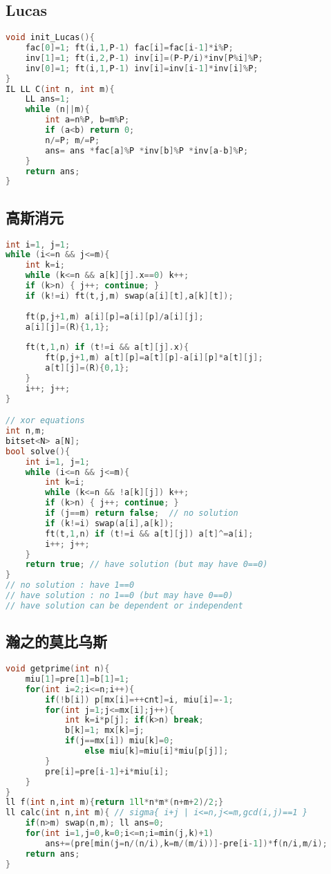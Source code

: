 \documentclass[landscape,a4paper]{article}
\begin{document}
\subsection{Lucas}
\begin{lstlisting}[language=C++]
void init_Lucas(){
	fac[0]=1; ft(i,1,P-1) fac[i]=fac[i-1]*i%P;
	inv[1]=1; ft(i,2,P-1) inv[i]=(P-P/i)*inv[P%i]%P;
	inv[0]=1; ft(i,1,P-1) inv[i]=inv[i-1]*inv[i]%P;
}
IL LL C(int n, int m){
	LL ans=1;
	while (n||m){
		int a=n%P, b=m%P;
		if (a<b) return 0;
		n/=P; m/=P;
		ans= ans *fac[a]%P *inv[b]%P *inv[a-b]%P;
	}
	return ans;
}
\end{lstlisting}

\subsection{高斯消元}
\begin{lstlisting}[language=C++]
int i=1, j=1;
while (i<=n && j<=m){
	int k=i;
	while (k<=n && a[k][j].x==0) k++;
	if (k>n) { j++; continue; }
	if (k!=i) ft(t,j,m) swap(a[i][t],a[k][t]);
	
	ft(p,j+1,m) a[i][p]=a[i][p]/a[i][j];
	a[i][j]=(R){1,1};
	
	ft(t,1,n) if (t!=i && a[t][j].x){
		ft(p,j+1,m) a[t][p]=a[t][p]-a[i][p]*a[t][j];
		a[t][j]=(R){0,1};
	}
	i++; j++;
}

// xor equations
int n,m;
bitset<N> a[N];
bool solve(){
	int i=1, j=1;	
	while (i<=n && j<=m){
		int k=i;
		while (k<=n && !a[k][j]) k++;
		if (k>n) { j++; continue; }
		if (j==m) return false;  // no solution
		if (k!=i) swap(a[i],a[k]);
		ft(t,1,n) if (t!=i && a[t][j]) a[t]^=a[i];
		i++; j++;
	}
	return true; // have solution (but may have 0==0)
}
// no solution : have 1==0
// have solution : no 1==0 (but may have 0==0)
// have solution can be dependent or independent
\end{lstlisting}

\subsection{瀚之的莫比乌斯}
\begin{lstlisting}[language=C++]
void getprime(int n){
	miu[1]=pre[1]=b[1]=1;
	for(int i=2;i<=n;i++){
		if(!b[i]) p[mx[i]=++cnt]=i, miu[i]=-1;
		for(int j=1;j<=mx[i];j++){
			int k=i*p[j]; if(k>n) break;
			b[k]=1; mx[k]=j;
			if(j==mx[i]) miu[k]=0;
				else miu[k]=miu[i]*miu[p[j]];
		}
		pre[i]=pre[i-1]+i*miu[i];
	}
}
ll f(int n,int m){return 1ll*n*m*(n+m+2)/2;} 
ll calc(int n,int m){ // sigma{ i+j | i<=n,j<=m,gcd(i,j)==1 }
	if(n>m) swap(n,m); ll ans=0;
	for(int i=1,j=0,k=0;i<=n;i=min(j,k)+1)
		ans+=(pre[min(j=n/(n/i),k=m/(m/i))]-pre[i-1])*f(n/i,m/i);
	return ans;
}
\end{lstlisting}
\end{document}
